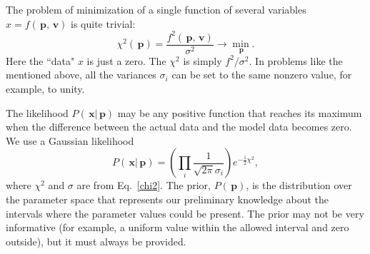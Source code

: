\documentclass[preprint2]{aastex}
\newcommand{\bfv}{\,\mathbf{v}}
\newcommand{\bp}{\,\mathbf{p}}
\newcommand{\bx}{\,\mathbf{x}}
\begin{document}
The problem of minimization of a single function of several variables $x = f(\bp,\bfv)$ is quite trivial:
\begin{equation}
  \label{optimization_problem}
  \chi^2(\bp) =  \frac{f^2(\bp,\bfv)}{\sigma^2} \rightarrow {\min\limits_{\bp}}.
\end{equation}
Here the ``data" $x$ is just a zero. The $\chi^2$ is simply $f^2/\sigma^2$. In problems like the mentioned above, all the variances $\sigma_i$ can be set to the same nonzero value, for example, to unity.

The likelihood $P(\bx|\bp)$ may be any positive function that reaches its maximum when the difference between the actual data and the model data becomes zero. We use a Gaussian likelihood
\begin{equation}
  \label{gaussian_likelihood}
  P(\bx|\bp) = \left(\prod_i \frac{1}{\sqrt{2 \pi} \sigma_i} \right) e^{-\frac{1}{2}\chi^2},
\end{equation}
where $\chi^2$ and $\sigma$ are from Eq.~\eqref{chi2}.
The prior, $P(\bp)$, is the distribution over the parameter space that represents our preliminary knowledge about the intervals where the parameter values could be present.
The prior may not be very informative (for example, a uniform value within the allowed interval and zero outside), but it must always be provided.  
\end{document}
